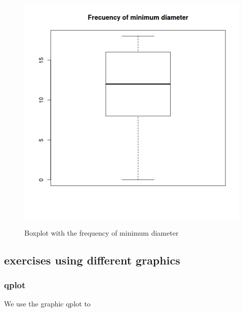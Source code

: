 \documentclass[10pt,a4paper]{article}
\begin{document}
\begin{figure}[hdp]
\centering
\includegraphics[scale=0.30]{boxplotmin.png}
\label{boxmin}
\caption{Boxplot with the frequency of minimum diameter}
\end{figure} 



\subsection{exercises using different graphics}

\subsubsection{qplot}

We use the graphic qplot to 





























 
\end{document}
